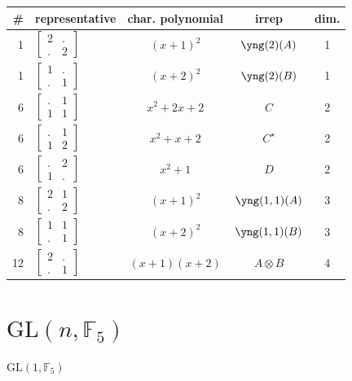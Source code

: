 \documentclass[11pt,oneside]{article}
\newcommand{\GL}{\mathrm{GL}}
\newcommand{\Field}{\mathbb{F}}
\newcommand{\tensor}{\otimes}
\begin{document}
\begin{center}
\begin{tabular}{r|l|c|c|c}
\# & representative & char. polynomial & irrep & dim. \\
\hline
1  &  $\begin{bmatrix}2&.\\.&2\end{bmatrix}$   & $(x+1)^2$  & $\yng(2)(A)$ & 1  \\
1  &  $\begin{bmatrix}1&.\\.&1\end{bmatrix}$   & $(x+2)^2$  & $\yng(2)(B)$ & 1  \\
6  &  $\begin{bmatrix}.&1\\1&1\end{bmatrix}$   & $x^2+2x+2$  & $C$ & 2  \\
6  &  $\begin{bmatrix}.&1\\1&2\end{bmatrix}$   & $x^2+x+2$  & $C^\star$ & 2  \\
6  &  $\begin{bmatrix}.&2\\1&.\end{bmatrix}$   & $x^2+1$  & $D$ & 2  \\
8  &  $\begin{bmatrix}2&1\\.&2\end{bmatrix}$   & $(x+1)^2$  & $\yng(1,1)(A)$ & 3  \\
8  &  $\begin{bmatrix}1&1\\.&1\end{bmatrix}$   & $(x+2)^2$  & $\yng(1,1)(B)$ & 3  \\
12  &  $\begin{bmatrix}2&.\\.&1\end{bmatrix}$   & $(x+1)(x+2)$  & $A\tensor B$ & 4  \\
\end{tabular}
\end{center}


\section{$\GL(n,\Field_5)$}


$\GL(1,\Field_5)$
\end{document}
